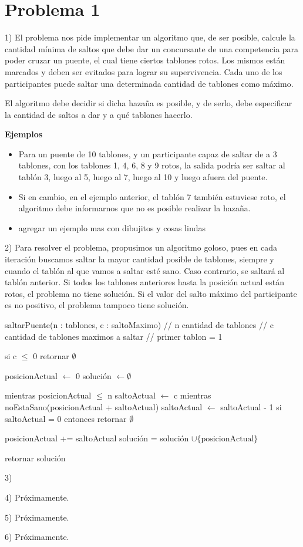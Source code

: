 \documentclass[a4paper]{article}
\begin{document}
\section{Problema 1}

1) El problema nos pide implementar un algoritmo que, de ser posible, calcule la
cantidad mínima de saltos que debe dar un concursante de una competencia para
poder cruzar un puente, el cual tiene ciertos tablones rotos. Los mismos están
marcados y deben ser evitados para lograr su supervivencia. Cada uno de los
participantes puede saltar una determinada cantidad de tablones como máximo.

El algoritmo debe decidir si dicha hazaña es posible, y de serlo, debe especificar
la cantidad de saltos a dar y a qué tablones hacerlo.

\textbf{Ejemplos}
\begin{itemize}
  \item Para un puente de 10 tablones, y un participante capaz de saltar de a 3
  tablones, con los tablones 1, 4, 6, 8 y 9 rotos, la salida podría ser saltar al
  tablón 3, luego al 5, luego al 7, luego al 10 y luego afuera del puente.
  \item Si en cambio, en el ejemplo anterior, el tablón 7 también estuviese roto,
  el algoritmo debe informarnos que no es posible realizar la hazaña.
  \item agregar un ejemplo mas con dibujitos y cosas lindas
\end{itemize}


2) Para resolver el problema, propusimos un algoritmo goloso, pues en cada iteración
buscamos saltar la mayor cantidad posible de tablones, siempre y cuando el tablón
al que vamos a saltar esté sano. Caso contrario, se saltará al tablón anterior.
Si todos los tablones anteriores hasta la posición actual están rotos, el problema
no tiene solución. Si el valor del salto máximo del participante es no positivo,
el problema tampoco tiene solución.

saltarPuente(n : tablones, c : saltoMaximo)
  // n cantidad de tablones
  // c cantidad de tablones maximos a saltar
  // primer tablon = 1
  
  si c $\leq$ 0
	retornar $\emptyset$
  
  posicionActual $\gets$ 0
  solución $\gets \emptyset$
  
  mientras posicionActual $\leq$ n
    saltoActual $\gets$ c
    mientras noEstaSano(posicionActual + saltoActual)
      saltoActual $\gets$ saltoActual - 1 
      si saltoActual = 0 entonces retornar $\emptyset$
    
    posicionActual += saltoActual
    solución = solución $\cup \{\text{posicionActual}\}$
   
  retornar solución

3) 

4) Próximamente.

5) Próximamente.

6) Próximamente.
\end{document}
